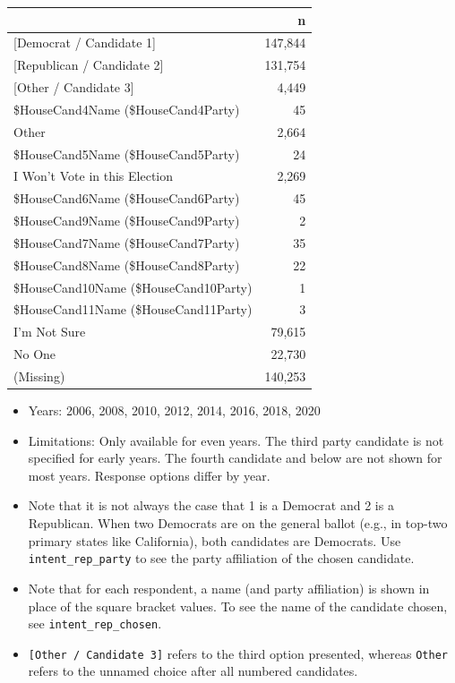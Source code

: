 \documentclass[10pt,article,oneside]{memoir}
\theoremstyle{definition}
\begin{document}
\begin{table}[H]
\centering
\begin{tabular}{lr}
\toprule
 & n\\
\midrule
{[Democrat / Candidate 1]} & 147,844\\
{[Republican / Candidate 2]} & 131,754\\
{[Other / Candidate 3]} & 4,449\\
\$HouseCand4Name (\$HouseCand4Party) & 45\\
Other & 2,664\\
\$HouseCand5Name (\$HouseCand5Party) & 24\\
I Won't Vote in this Election & 2,269\\
\$HouseCand6Name (\$HouseCand6Party) & 45\\
\$HouseCand9Name (\$HouseCand9Party) & 2\\
\$HouseCand7Name (\$HouseCand7Party) & 35\\
\$HouseCand8Name (\$HouseCand8Party) & 22\\
\$HouseCand10Name (\$HouseCand10Party) & 1\\
\$HouseCand11Name (\$HouseCand11Party) & 3\\
I'm Not Sure & 79,615\\
No One & 22,730\\
(Missing) & 140,253\\
\bottomrule
\end{tabular}
\end{table}

\begin{itemize}
\tightlist
\item
  Years: 2006, 2008, 2010, 2012, 2014, 2016, 2018, 2020
\item
  Limitations: Only available for even years. The third party candidate
  is not specified for early years. The fourth candidate and below are
  not shown for most years. Response options differ by year.
\item
  Note that it is not always the case that 1 is a Democrat and 2 is a
  Republican. When two Democrats are on the general ballot (e.g., in
  top-two primary states like California), both candidates are
  Democrats. Use \texttt{intent\_rep\_party} to see the party
  affiliation of the chosen candidate.
\item
  Note that for each respondent, a name (and party affiliation) is shown
  in place of the square bracket values. To see the name of the
  candidate chosen, see \texttt{intent\_rep\_chosen}.
\item
  \texttt{{[}Other\ /\ Candidate\ 3{]}} refers to the third option
  presented, whereas \texttt{Other} refers to the unnamed choice after
  all numbered candidates.
\end{itemize}
\end{document}
